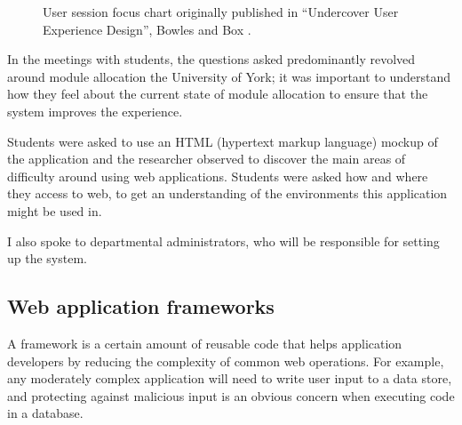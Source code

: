 \documentclass[]{scrartcl}
\begin{document}
\begin{figure}
  \begin{center}
  \end{center}
  \caption{User session focus chart originally published in
    ``Undercover User Experience Design'', Bowles and Box \cite{bowles2011undercover}.}
  \label{bowles_dualpurpose_chart}
\end{figure}

In the meetings with students, the questions asked predominantly revolved
around module allocation the University of York; it was important to
understand how they feel about the current state of module allocation to
ensure that the system improves the experience.

Students were asked to use an HTML (hypertext markup language) mockup of the
application and the researcher observed to discover the main areas of
difficulty around using web applications. Students were asked how and where
they access to web, to get an understanding of the environments this
application might be used in.


I also spoke to departmental administrators, who will be responsible for setting up
the system.


\subsection{Web application frameworks}

A framework is a certain amount of reusable code that helps application developers by reducing the complexity of common web operations. For example, any moderately complex application will need to write user input to a data store, and protecting against malicious input is an obvious concern when executing code in a database.
\end{document}
